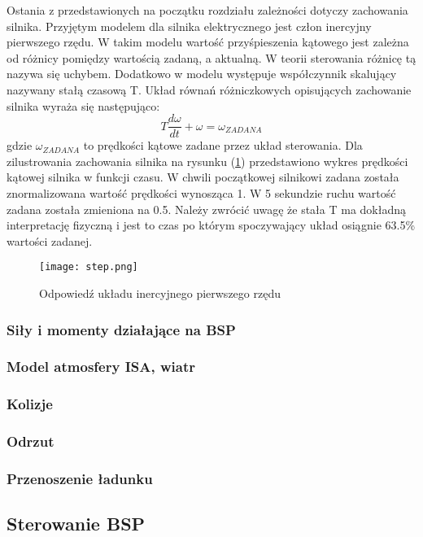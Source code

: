 Ostania z przedstawionych na początku rozdziału zależności dotyczy zachowania silnika. Przyjętym modelem dla silnika elektrycznego jest człon inercyjny pierwszego rzędu. W takim modelu wartość przyśpieszenia kątowego jest zależna od różnicy pomiędzy wartością zadaną, a aktualną. W teorii sterowania różnicę tą nazywa się uchybem. Dodatkowo w modelu występuje współczynnik skalujący nazywany stałą czasową T. Układ równań różniczkowych opisujących zachowanie silnika wyraża się następująco:
 \[
	T \frac{d\omega}{dt} + \omega = \omega_{ZADANA}
\]
gdzie $\omega_{ZADANA}$ to prędkości kątowe zadane przez układ sterowania. Dla zilustrowania zachowania silnika na rysunku (\ref{rotor_step}) przedstawiono wykres prędkości kątowej silnika w funkcji czasu. W chwili początkowej silnikowi zadana została znormalizowana wartość prędkości wynosząca 1. W 5 sekundzie ruchu wartość zadana została zmieniona na 0.5. Należy zwrócić uwagę że stała T ma dokładną interpretację fizyczną i jest to czas po którym spoczywający układ osiągnie 63.5\% wartości zadanej.

\begin{figure}[!h]
   	\centering
      	\texttt{[image: step.png]}
      	\caption{Odpowiedź układu inercyjnego pierwszego rzędu}
      	\label{rotor_step}
\end{figure}






\subsubsection{Siły i momenty działające na BSP}
\subsubsection{Model atmosfery ISA, wiatr}
\subsubsection{Kolizje}
\subsubsection{Odrzut}
\subsubsection{Przenoszenie ładunku}
\subsection{Sterowanie BSP}
